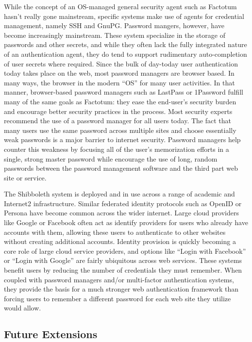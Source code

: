 \documentclass{sig-alternate}
\begin{document}
While the concept of an OS-managed general security agent such as
Factotum hasn't really gone mainstream, specific systems make use of
agents for credential management, namely SSH and GnuPG. Password
mangers, however, have become increasingly mainstream. These system
specialize in the storage of passwords and other secrets, and while
they often lack the fully integrated nature of an authentication
agent, they do tend to support rudimentary auto-completion of user
secrets where required. Since the bulk of day-today user
authentication today takes place on the web, most password managers
are browser based. In many ways, the browser in the modern ``OS'' for
many user activities. In that manner, browser-based password managers
such as LastPass or 1Password fulfill many of the same goals as
Factotum: they ease the end-user's security burden and encourage
better security practices in the process. Most security experts
recommend the use of a password manager for all users today. The fact
that many users use the same password across multiple sites and choose
essentially weak passwords is a major barrier to internet
security. Password managers help counter this weakness by focusing all
of the user's memorization efforts in a single, strong master password
while encourage the use of long, random passwords between the password
management software and the third part web site or service.

The Shibboleth system is deployed and in use across a range of
academic and Internet2 infrastructure. Similar federated identity
protocols such as OpenID or Persona have become common across the
wider internet. Large cloud providers like Google or Facebook often
act as identify providers for users who already have accounts with
them, allowing these users to authenticate to other websites without
creating additional accounts. Identity provision is quickly becoming a
core role of large cloud service providers, and options like ``Login
with Facebook'' or ``Login with Google'' are fairly ubiquitous across
web services. These systems benefit users by reducing the number of
credentials they must remember. When coupled with password managers
and/or multi-factor authentication systems, they provide the basis for
a much stronger web authentication framework than forcing users to
remember a different password for each web site they utilize would
allow.

\subsection{Future Extensions}
\end{document}
